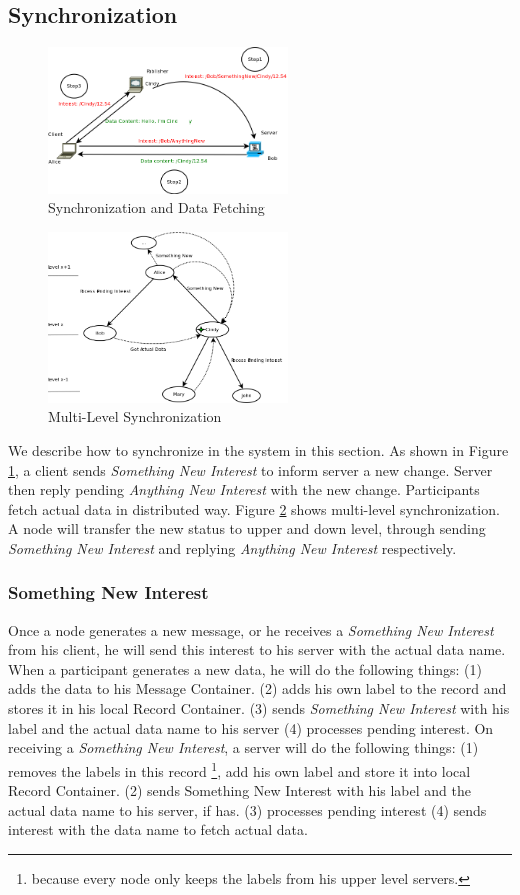 \documentclass[conference]{IEEEtran}
\begin{document}
\subsection{Synchronization}
\begin{figure}[!t]
\centering
\includegraphics[width=2.5in]{../png/synchronization.png}
\caption{Synchronization and Data Fetching}
\label{synchronization}
\end{figure}
\begin{figure}[!t]
\centering
\includegraphics[width=2.5in]{../png/tree-synchronization.png}
\caption{Multi-Level Synchronization}
\label{tree_synchronization}
\end{figure}
We describe how to synchronize in the system in this section. As shown in Figure \ref{synchronization}, a client sends \emph{Something New Interest} to inform server a new change. Server then reply pending \emph{Anything New Interest} with the new change. Participants fetch actual data in distributed way. Figure \ref{tree_synchronization} shows multi-level synchronization. A node will transfer the new status to upper and down level, through sending \emph{Something New Interest} and replying \emph{Anything New Interest} respectively.

\subsubsection{Something New Interest}
Once a node generates a new message, or he receives a \emph{Something New Interest} from his client, he will send this interest to his server with the actual data name.
When a participant generates a new data, he will do the following things:
(1) adds the data to his Message Container.
(2) adds his own label to the record and stores it in his local Record Container.
(3) sends \emph{Something New Interest} with his label and the actual data name to his server
(4) processes pending interest.
On receiving a \emph{Something New Interest}, a server  will do the following things:
(1) removes the labels in this record \footnote{because every node only keeps the labels from his upper level servers.}, add his own label and store it into local Record Container.
(2) sends Something New Interest with his label and the actual data name to his server, if has.
(3) processes pending interest
(4) sends interest with the data name to fetch actual data.
\end{document}
